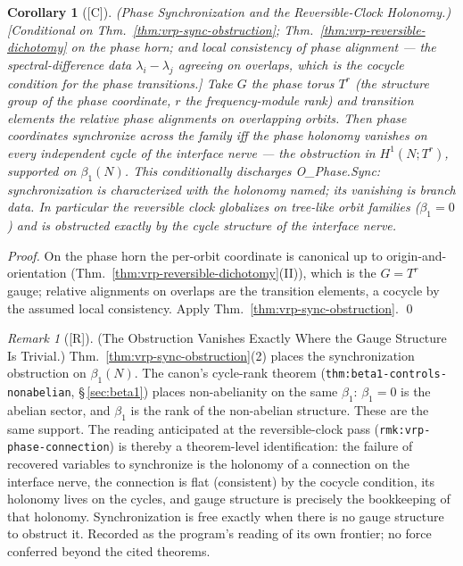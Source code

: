 \documentclass[12pt,oneside]{amsbook}
\theoremstyle{plain}
\newtheorem{corollary}[theorem]{Corollary}
\theoremstyle{definition}
\theoremstyle{remark}
\newtheorem{remark}[theorem]{Remark}
\newcommand{\status}[1]{\textup{[#1]}}
\begin{document}
\begin{corollary}[\status{C}]\label{cor:vrp-phase-sync-discharge}
\textup{(Phase Synchronization and the Reversible-Clock
Holonomy.)}
\textup{[Conditional on Thm.~\ref{thm:vrp-sync-obstruction};
Thm.~\ref{thm:vrp-reversible-dichotomy} on the phase horn; and
local consistency of phase alignment --- the spectral-difference
data $\lambda_i - \lambda_j$ agreeing on overlaps, which is the
cocycle condition for the phase transitions.]}
Take $G$ the phase torus $T^r$ (the structure group of the phase
coordinate, $r$ the frequency-module rank) and transition elements
the relative phase alignments on overlapping orbits.  Then phase
coordinates synchronize across the family iff the phase holonomy
vanishes on every independent cycle of the interface nerve ---
the obstruction in $H^1(N; T^r)$, supported on $\beta_1(N)$.  This
conditionally discharges O\_Phase.Sync: synchronization is
characterized with the holonomy named; its vanishing is branch
data.  In particular the reversible clock globalizes on tree-like
orbit families ($\beta_1 = 0$) and is obstructed exactly by the
cycle structure of the interface nerve.
\end{corollary}

\begin{proof}
On the phase horn the per-orbit coordinate is canonical up to
origin-and-orientation (Thm.~\ref{thm:vrp-reversible-dichotomy}(II)),
which is the $G = T^r$ gauge; relative alignments on overlaps are
the transition elements, a cocycle by the assumed local
consistency.  Apply Thm.~\ref{thm:vrp-sync-obstruction}. \qed
\end{proof}

\begin{remark}[\status{R}]\label{rmk:vrp-sync-gauge}
\textup{(The Obstruction Vanishes Exactly Where the Gauge
Structure Is Trivial.)}
Thm.~\ref{thm:vrp-sync-obstruction}(2) places the synchronization
obstruction on $\beta_1(N)$.  The canon's cycle-rank theorem
(\texttt{thm:beta1-controls-nonabelian}, \S\,\ref{sec:beta1})
places non-abelianity on the same $\beta_1$:
$\beta_1 = 0$ is the abelian sector, and $\beta_1$ is the rank of
the non-abelian structure.  These are the same support.  The
reading anticipated at the reversible-clock pass
(\texttt{rmk:vrp-phase-connection}) is thereby a theorem-level
identification: the failure of recovered variables to synchronize
is the holonomy of a connection on the interface nerve, the
connection is flat (consistent) by the cocycle condition, its
holonomy lives on the cycles, and gauge structure is precisely the
bookkeeping of that holonomy.  Synchronization is free exactly
when there is no gauge structure to obstruct it.  Recorded as the
program's reading of its own frontier; no force conferred beyond
the cited theorems.
\end{remark}
\end{document}
